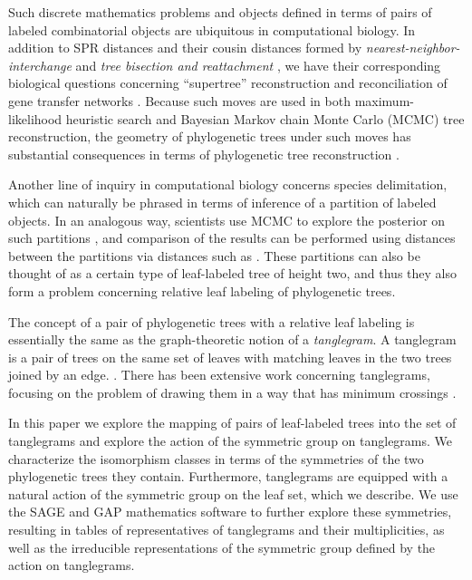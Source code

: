 \documentclass{amsart}
\begin{document}
Such discrete mathematics problems and objects defined in terms of pairs of labeled combinatorial objects are ubiquitous in computational biology.
In addition to SPR distances and their cousin distances formed by \emph{nearest-neighbor-interchange} and \emph{tree bisection and reattachment} \cite{wiki:treeRearrangement}, we have their corresponding biological questions concerning ``supertree'' reconstruction \cite{Whidden2014-ku} and reconciliation of gene transfer networks \cite{Boon2013-mc}.
Because such moves are used in both maximum-likelihood heuristic search and Bayesian Markov chain Monte Carlo (MCMC) tree reconstruction, the geometry of phylogenetic trees under such moves has substantial consequences in terms of phylogenetic tree reconstruction \cite{Whidden2014-yt}.

Another line of inquiry in computational biology concerns species delimitation, which can naturally be phrased in terms of inference of a partition of labeled objects.
In an analogous way, scientists use MCMC to explore the posterior on such partitions \cite{Yang2010-kc}, and comparison of the results can be performed using distances between the partitions via distances such as \cite{Gusfield2002-il}.
These partitions can also be thought of as a certain type of leaf-labeled tree of height two, and thus they also form a problem concerning relative leaf labeling of phylogenetic trees.

The concept of a pair of phylogenetic trees with a relative leaf labeling is essentially the same as the graph-theoretic notion of a \emph{tanglegram}.
A tanglegram is a pair of trees on the same set of leaves with matching leaves in the two trees joined by an edge. \cite{Venkatachalam2010-zh}.
There has been extensive work concerning tanglegrams, focusing on the problem of drawing them in a way that has minimum crossings \cite{Buchin2008-lc,Lozano2008-tp,Bansal2009-ni,Bocker2009-xl,Fernau2010-an,Venkatachalam2010-zh}.

In this paper we explore the mapping of pairs of leaf-labeled trees into the set of tanglegrams and explore the action of the symmetric group on tanglegrams.
We characterize the isomorphism classes in terms of the symmetries of the two phylogenetic trees they contain.
Furthermore, tanglegrams are equipped with a natural action of the symmetric group on the leaf set, which we describe.
We use the SAGE \cite{SteinJoyner2005} and GAP \cite{GAP4} mathematics software to further explore these symmetries, resulting in tables of representatives of tanglegrams and their multiplicities, as well as the irreducible representations of the symmetric group defined by the action on tanglegrams.
\end{document}

